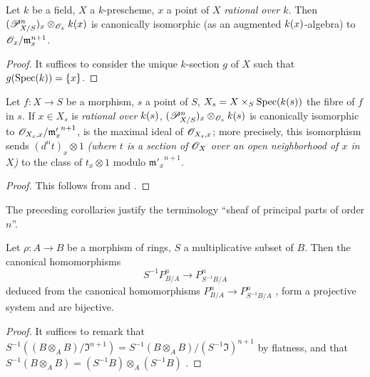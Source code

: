 \begin{corollary}[16.4.12]
\label{IV.16.4.12}
Let $k$ be a field, $X$ a $k$-prescheme, $x$ a point of $X$ \emph{rational over $k$}.
Then $(\mathscr{P}_{X/S}^n)_x \otimes_{\mathscr{O}_x} k(x)$ is canonically isomorphic (as an augmented $k(x)$-algebra) to $\mathscr{O}_x/\mathfrak{m}_x^{n+1}$.
\end{corollary}

\begin{proof}
It suffices to consider the unique $k$-section $g$ of $X$ such that $g(\operatorname{Spec}(k)) = \{x\}$.
\end{proof}

\begin{corollary}[16.4.13]
\label{IV.16.4.13}
Let $f: X \to S$ be a morphism, $s$ a point of $S$, $X_s = X \times_S \operatorname{Spec}(k(s))$ the fibre of $f$ in $s$.
If $x \in X_s$ is \emph{rational over $k(s)$}, $(\mathscr{P}_{X/S}^n)_x \otimes_{\mathscr{O}_s} k(s)$ is canonically isomorphic to $\mathscr{O}_{X_s, x}/{\mathfrak{m}'_x}^{n+1}$, is the maximal ideal of $\mathscr{O}_{X_s, x}$;
more precisely, this isomorphism sends $(d^n t)_x \otimes 1$ \emph{(where $t$ is a section of $\mathscr{O}_X$ over an open neighborhood of $x$ in $X$)} to the class of $t_x \otimes 1$ modulo ${\mathfrak{m}'_x}^{n+1}$.
\end{corollary}

\begin{proof}
This follows from  and .
\end{proof}

The preceding corollaries justify the terminology ``sheaf of principal parts of order $n$''.

\begin{proposition}[16.4.14]
\label{IV.16.4.14}
Let $\rho:A \to B$ be a morphism of rings, $S$ a multiplicative subset of $B$.
Then the canonical homomorphisms 
\[
  \label{IV.16.4.14.1}
  S^{-1}P_{B/A}^n \to P_{S^{-1}B/A}^n
  \tag{16.4.14.1}
\] 
deduced from the canonical homomorphisms $P_{B/A}^n \to P_{S^{-1}B/A}^n$ , form a projective system and are bijective.
\end{proposition}

\begin{proof}
It suffices to remark that $S^{-1}((B \otimes_A B)/\mathfrak{I}^{n+1}) = S^{-1}(B \otimes_A B)/(S^{-1}\mathfrak{I})^{n+1}$ by flatness, and that $S^{-1}(B \otimes_A B) = (S^{-1}B)\otimes_A (S^{-1}B) $ .
\end{proof}

